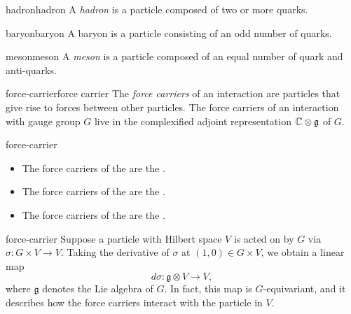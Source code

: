 \begin{topic}{hadron}{hadron}
    A \emph{hadron} is a particle composed of two or more quarks.
\end{topic}

\begin{topic}{baryon}{baryon}
    A baryon is a particle consisting of an odd number of quarks.
\end{topic}

%     

\begin{topic}{meson}{meson}
    A \emph{meson} is a particle composed of an equal number of quark and anti-quarks.
\end{topic}

\begin{topic}{force-carrier}{force carrier}
    The \emph{force carriers} of an interaction are particles that give rise to forces between other particles. The force carriers of an interaction with gauge group $G$ live in the complexified adjoint representation $\mathbb{C} \otimes \mathfrak{g}$ of $G$.
\end{topic}

\begin{example}{force-carrier}
    \begin{itemize}
        \item The force carriers of the  are the .
        \item The force carriers of the  are the .
        \item The force carriers of the  are the .
    \end{itemize}
\end{example}

\begin{example}{force-carrier}
    Suppose a particle with Hilbert space $V$ is acted on by $G$ via $\sigma \colon G \times V \to V$. Taking the derivative of $\sigma$ at $(1, 0) \in G \times V$, we obtain a linear map
    \[ d \sigma \colon \mathfrak{g} \otimes V \to V , \]
    where $\mathfrak{g}$ denotes the Lie algebra of $G$. In fact, this map is $G$-equivariant, and it describes how the force carriers interact with the particle in $V$.
\end{example}

